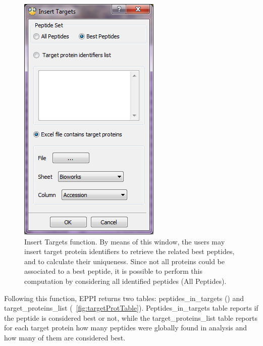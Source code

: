 \documentclass[a4paper,14pt]{extarticle}
\begin{document}
\begin{figure}[htbp]
\begin{center}
\includegraphics[scale=0.8]{Eppi_insert_target}
\caption{Insert Targets function. By means of this window, the users may insert target protein identifiers to retrieve the related best peptides, and to calculate their uniqueness. Since not all proteins could be associated to a best peptide, it is possible to perform this computation by considering all identified peptides (All Peptides). }\label{fig:targetProt}
\end{center}
\end{figure}

Following this function, EPPI returns two tables: peptides\_in\_targets (\label{fig:targetPepTable}) and target\_proteins\_list (\figurename~\ref{fig:targetProtTable}). Peptides\_in\_targets table reports if the peptide is considered best or not, while the target\_proteins\_list table reports for each target protein how many peptides were globally found in analysis and how many of them are considered best.
\end{document}
